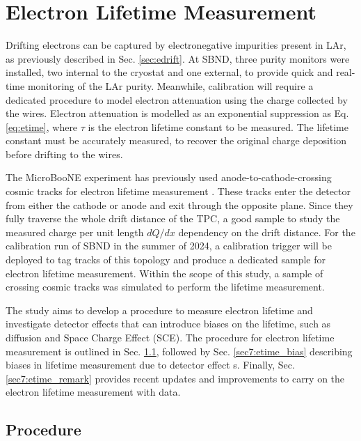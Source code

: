 \newpage
\section{Electron Lifetime Measurement}
\label{sec7:etime}
Drifting electrons can be captured by electronegative impurities present in LAr, as previously described in Sec. \ref{sec:edrift}.
At SBND, three purity monitors were installed, two internal to the cryostat and one external, to provide quick and real-time monitoring of the LAr purity.
Meanwhile, calibration will require a dedicated procedure to model electron attenuation using the charge collected by the wires.
Electron attenuation is modelled as an exponential suppression as Eq. \ref{eq:etime}, where $\tau$ is the electron lifetime constant to be measured.
The lifetime constant must be accurately measured, to recover the original charge deposition before drifting to the wires.

The MicroBooNE experiment has previously used anode-to-cathode-crossing cosmic tracks for electron lifetime measurement \cite{uboone_calib}.
These tracks enter the detector from either the cathode or anode and exit through the opposite plane.
Since they fully traverse the whole drift distance of the TPC,   a good sample to study the measured charge per unit length $dQ/dx$ dependency on the drift distance.
For the calibration run of SBND in the summer of 2024, a calibration trigger will be deployed to tag tracks of this topology and produce a dedicated sample for electron lifetime measurement.
Within the scope of this study, a sample of crossing cosmic tracks was simulated to perform the lifetime measurement.

The study aims to develop a procedure to measure electron lifetime and investigate detector effects that can introduce biases on the lifetime, such as diffusion and Space Charge Effect (SCE).
The procedure for electron lifetime measurement is outlined in Sec. \ref{sec7:etime_procedure}, followed by Sec. \ref{sec7:etime_bias} describing biases in lifetime measurement due to detector effect
s.
Finally, Sec. \ref{sec7:etime_remark} provides recent updates and improvements to carry on the electron lifetime measurement with data.

\subsection{Procedure}
\label{sec7:etime_procedure}

